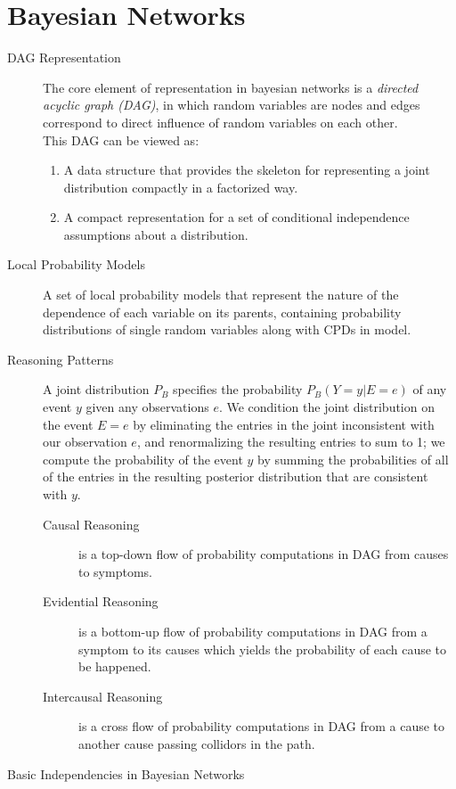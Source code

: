 \documentclass{article}
\begin{document}
\section{Bayesian Networks}
\begin{description}
\item[DAG Representation]
The core element of representation in bayesian networks is a \textit{directed acyclic graph (DAG)}, in which random variables are nodes and edges correspond to direct influence of random variables on each other.\\
This DAG can be viewed as:\\
	\begin{enumerate}
	\item A data structure that provides the skeleton for representing a joint distribution compactly in a factorized way.
	\item A compact representation for a set of conditional independence assumptions about a distribution.
	\end{enumerate}
	
\item[Local Probability Models] A set of local probability
models that represent the nature of the dependence of each variable on its parents, containing probability distributions of single random variables along with CPDs in model.

\item[Reasoning Patterns] A joint distribution $P_B$ specifies the probability $P_B (Y = y | E = e)$ of any event $y$ given any observations $e$. We condition the joint distribution on the event $E = e$ by eliminating the entries in the joint inconsistent with our observation $e$, and renormalizing the resulting entries to sum to 1; we compute the probability of the event $y$ by summing the probabilities of all of the entries in the resulting posterior distribution that are consistent with $y$.
\begin{description}
	\item[Causal Reasoning] is a top-down flow of probability computations in DAG from causes to symptoms.
	\item[Evidential Reasoning] is a bottom-up flow of probability computations in DAG from a symptom to its causes which yields the probability of each cause to be happened.
	\item[Intercausal Reasoning] is a cross flow of probability computations in DAG from a cause to another cause passing collidors in the path.
\end{description}

\item[Basic Independencies in Bayesian Networks]
\end{description}







\end{document}
